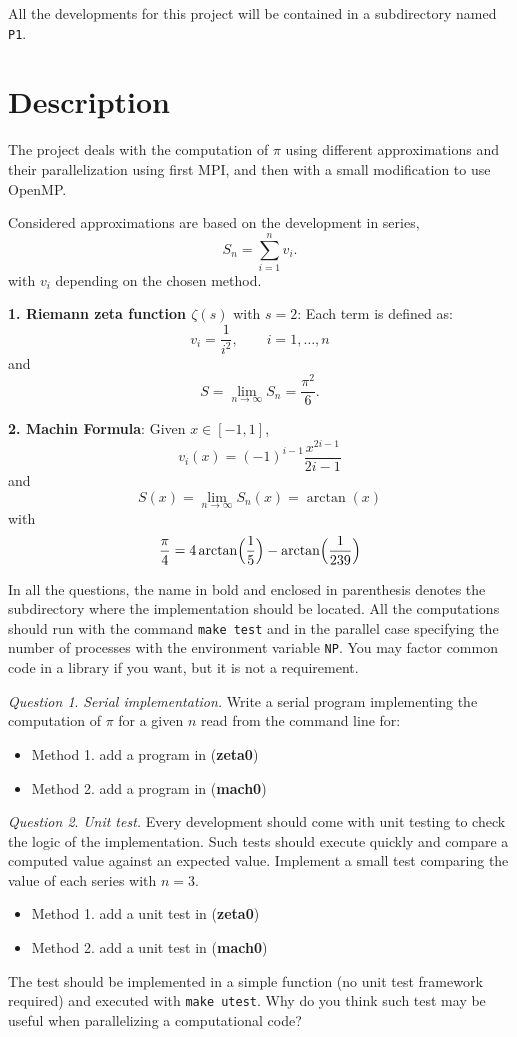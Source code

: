 \documentclass[onecolumn, oneside, a4paper, 11pt]{memoir}
\theoremstyle{remark}
\newtheorem{ex}{Question}
\begin{document}
All the developments for this project will be contained in a subdirectory named \texttt{P1}.


\section*{Description}

The project deals with the computation of $\pi$ using different approximations and their parallelization using first MPI, and then with a small modification to use OpenMP.

\medskip
Considered approximations are based on the development in series,
\[
  S_n = \sum_{i=1}^n v_i.
\]
with $v_i$ depending on the chosen method.

\bigskip
\textbf{1. Riemann zeta function $\zeta(s)$} with $s = 2$:
Each term is defined as:
\[
  v_i = \frac{1}{i^2}, \qquad i=1,\ldots,n
\]
and
\[
S = \lim_{n\to\infty} S_n = \frac{\pi^2}{6}.
\]

\bigskip
\textbf{2. Machin Formula}:
Given $x \in [-1,1]$,
\[
  v_i(x) = (-1)^{i-1} \dfrac{x^{2i-1}}{2i - 1}
\]
and
\[
  S(x) = \lim_{n\to\infty} S_n(x) = \arctan(x)
\]
with
\[
\dfrac{\pi}{4} = 4 \arctan\Bigl(\dfrac{1}{5}\Bigr) - \arctan\Bigl(\dfrac{1}{239}\Bigr)
\]

\bigskip
In all the questions, the name in bold and enclosed in parenthesis denotes the subdirectory where the implementation should be located. All the computations should run with the command \texttt{make test} and in the parallel case specifying the number of processes with the environment variable \texttt{NP}.
You may factor common code in a library if you want, but it is not a requirement.

\bigskip
\begin{ex}
\textit{Serial implementation.} Write a serial program implementing the computation of $\pi$ for a given $n$ read from the command line for:
  \begin{itemize}
  \item Method 1. add a program in (\textbf{zeta0})
  \item Method 2. add a program in (\textbf{mach0})
  \end{itemize}
\end{ex}

\bigskip
\begin{ex}
\textit{Unit test.} Every development should come with unit testing to check the logic of the implementation.
Such tests should execute quickly and compare a computed value against an expected value.
Implement a small test comparing the value of each series with $n = 3$.
  \begin{itemize}
  \item Method 1. add a unit test in (\textbf{zeta0})
  \item Method 2. add a unit test in (\textbf{mach0})
  \end{itemize}
The test should be implemented in a simple function (no unit test framework required) and executed with \texttt{make utest}.
Why do you think such test may be useful when parallelizing a computational code?
\end{ex}
\end{document}
